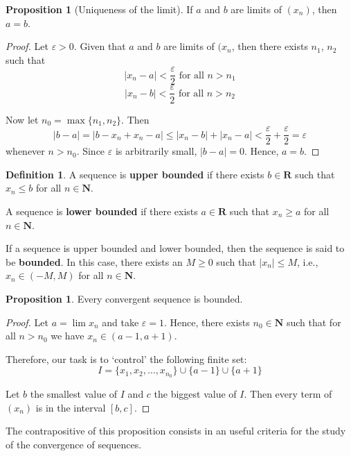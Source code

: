 \documentclass[12pt,a4paper]{article}
\theoremstyle{definition}
\newtheorem{proposition}[theorem]{Proposition}
\newtheorem{definition}{Definition}[section]
\begin{document}
\begin{proposition}[Uniqueness of the limit]
	If $a$ and $b$ are limits of $(x_n)$, then $a=b$.
\end{proposition}

\begin{proof}
	Let $\varepsilon > 0$. Given that $a$ and $b$ are limits of $(x_n$, then there exists $n_1$, $n_2$ such that
	\[
		| x_n - a | < \frac{\varepsilon}{2} \text{ for all } n > n_1
	\]
	\[
		| x_n - b | < \frac{\varepsilon}{2} \text{ for all } n > n_2
	\]
	
	Now let $n_0 = \max \{ n_1, n_2 \}$. Then
	\[
		| b - a | = | b - x_n + x_n - a | \leq |x_n - b| + |x_n - a| < \frac{\varepsilon}{2} + \frac{\varepsilon}{2} = \varepsilon
	\]
	whenever $n > n_0$. Since $\varepsilon$ is arbitrarily small, $|b-a| = 0$. Hence, $a = b$. 
\end{proof}

\begin{definition}
	A sequence is \textbf{upper bounded} if there exists $b \in \textbf{R}$ such that $x_n \leq b$ for all $n \in \textbf{N}$.
	
	A sequence is \textbf{lower bounded} if there exists $a \in \textbf{R}$ such that $x_n \geq a$ for all $n \in \textbf{N}$.
	
	If a sequence is upper bounded and lower bounded, then the sequence is said to be \textbf{bounded}. In this case, there exists an $M \geq 0$ such that $| x_n | \leq M$, i.e., $x_n \in (-M, M)$ for all $n \in \textbf{N}$.
\end{definition}

\begin{proposition}
	Every convergent sequence is bounded.
\end{proposition}

\begin{proof}
	Let $a = \lim x_n$ and take $\varepsilon = 1$. Hence, there exists $n_0 \in \textbf{N}$ such that for all $n > n_0$ we have $x_n \in (a-1, a+1)$. 
	
	Therefore, our task is to `control' the following finite set: \[ I = \{ x_1, x_2, \ldots, x_{n_0} \} \cup \{a-1\} \cup \{a+1\} \]
	
	Let $b$ the smallest value of $I$ and $c$ the biggest value of $I$. Then every term of $(x_n)$ is in the interval $[ b, c ]$.
\end{proof}

The contrapositive of this proposition consists in an useful criteria for the study of the convergence of sequences.
\end{document}
